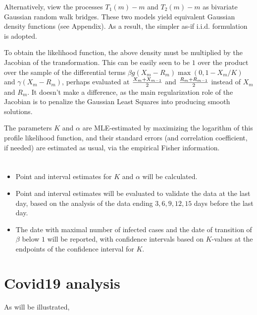 \documentclass{article}
\begin{document}
{Alternatively, view the processes $T_1(m)-m$ and $T_2(m)-m$ as bivariate Gaussian random walk bridges.
These two models yield equivalent Gaussian density functions (see Appendix). As a result, the simpler as-if i.i.d. formulation is adopted.

To obtain the likelihood function, the above density must be multiplied by the Jacobian of the transformation. This can be easily seen to be $1$ over the product over the sample of the differential terms $\beta g(X_m-R_m)\max(0,1-X_m/K)$ and $\gamma (X_m-R_m)$, perhaps evaluated at
${{X_m+X_{m-1}} \over 2}$ and ${{R_m+R_{m-1}} \over 2}$ instead of $X_m$ and $R_m$. It doesn't make a difference, as the main regularization role of the Jacobian is to penalize the Gaussian Least Squares into producing smooth solutions.

\bigskip

The parameters $K$ and $\alpha$ are MLE-estimated by maximizing the logarithm of this profile likelihood function, and their standard errors (and correlation coefficient, if needed) are estimated as usual, via the empirical Fisher information.

\section{}

\begin{itemize}

\item Point and interval estimates for $K$ and $\alpha$ will be calculated.

\item Point and interval estimates will be evaluated to validate the data at the last day, based on the analysis of the data ending $3,6,9,12,15$ days before the last day.

\item The date with maximal number of infected cases and the date of transition of $\beta$ below $1$ will be reported, with confidence intervals based on $K$-values at the endpoints of the confidence interval for $K$.

\end{itemize}

\section{Covid19 analysis} \label{Covid19}

As will be illustrated,

}
\end{document}

